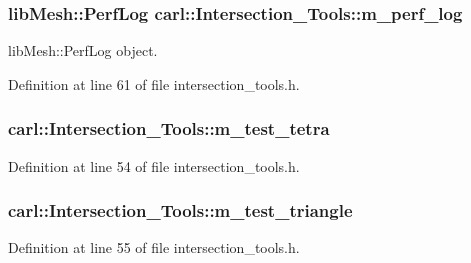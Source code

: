 \subsubsection[{m\+\_\+perf\+\_\+log}]{\setlength{\rightskip}{0pt plus 5cm}lib\+Mesh\+::\+Perf\+Log carl\+::\+Intersection\+\_\+\+Tools\+::m\+\_\+perf\+\_\+log\hspace{0.3cm}{\ttfamily [protected]}}\label{classcarl_1_1_intersection___tools_afe18e6ca5fd12bae08efb98f69c71a48}


lib\+Mesh\+::\+Perf\+Log object. 



Definition at line 61 of file intersection\+\_\+tools.\+h.

\hypertarget{classcarl_1_1_intersection___tools_a69657597ebb9655f8797b289939835a3}{}
\subsubsection[{m\+\_\+test\+\_\+tetra}]{ carl\+::\+Intersection\+\_\+\+Tools\+::m\+\_\+test\+\_\+tetra\hspace{0.3cm}{\ttfamily [protected]}}\label{classcarl_1_1_intersection___tools_a69657597ebb9655f8797b289939835a3}


Definition at line 54 of file intersection\+\_\+tools.\+h.

\hypertarget{classcarl_1_1_intersection___tools_a4331121a50baaa93e499f6cfb446c1b0}{}
\subsubsection[{m\+\_\+test\+\_\+triangle}]{ carl\+::\+Intersection\+\_\+\+Tools\+::m\+\_\+test\+\_\+triangle\hspace{0.3cm}{\ttfamily [protected]}}\label{classcarl_1_1_intersection___tools_a4331121a50baaa93e499f6cfb446c1b0}


Definition at line 55 of file intersection\+\_\+tools.\+h.

